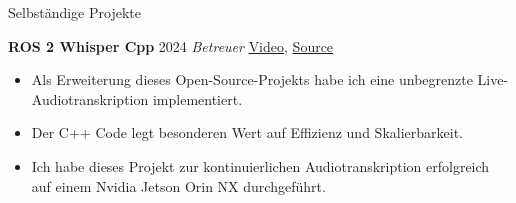 \begin{rubric}{Selbständige Projekte}

\entry*[] \textbf{ROS 2 Whisper Cpp} \hfill 2024 \newline 
\emph{Betreuer} \hfill \href{https://github.com/ros-ai/ros2_whisper/blob/main/doc/harry_potter_sample.gif}{Video}, \href{https://github.com/ros-ai/ros2_whisper}{\faGithub Source} \newline  
\vspace{\CVItemizeHeaderSpacing} \begin{itemize}[leftmargin=*, rightmargin=1cm]
	\setlength{\itemsep}{\CVItemizeSpacing}
	\item Als Erweiterung dieses Open-Source-Projekts habe ich eine unbegrenzte Live-Audiotranskription implementiert. 
	\item Der C++ Code legt besonderen Wert auf Effizienz und Skalierbarkeit.
	\item Ich habe dieses Projekt zur kontinuierlichen Audiotranskription erfolgreich auf einem Nvidia Jetson Orin NX durchgeführt.
\end{itemize}  
\begin{comment}

\entry*[] \textbf{ROS 2 Computer Vision} \hfill 2024 \newline \emph{Autor} \hfill \href{https://github.com/NathanCorral/ROS-HF-Vision/blob/main/doc/gifs/ex_german_roads.gif}{Video}, \href{https://github.com/NathanCorral/ROS-HF-Vision/tree/main}{\faGithub Source} \newline  
\vspace{\CVItemizeHeaderSpacing} \begin{itemize}[leftmargin=*, rightmargin=1cm] 
	\setlength{\itemsep}{\CVItemizeSpacing}  
	\item Dieses Projekt implementiert Computer-Vision (CV) Aufgaben (Objekterkennung, Maskenbeschriftung pro Pixel) als parallele ROS 2-Knoten.
	\item Modernste CV Modellen (wie DETR und Maskformer) sind von Hugging Face ~~~~~~~~~~~~ automatisch heruntergeladen.
	\item Die Ergebnisse der CV Modellen, die auf verschiedenen Datensätzen trainiert  ~~~~~~~~~~~~~~ worden sein können, werden von einem globalen Server in einen universellen ~~~~~~~~~~~~~~ Index umgewandelt.  
	\item Diese Pipeline wird entweder auf eine Live-Kameraübertragung oder auf Bilder aus einem vorab trainierten Datensatz angewandt, wobei die Ergebnisse in Echtzeit angezeigt werden, um die durch die Modellwahl verursachte unterschiedliche Verzögerung zu verdeutlichen.
\end{itemize}  


\end{comment}
\end{rubric}
